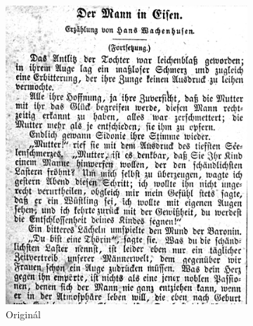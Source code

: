 \documentclass[12pt,a4paper]{article}
\begin{document}
\begin{figure}[h!]
    \centering
    \begin{subfigure}[b]{0.3\textwidth}
        \includegraphics[width=\textwidth]{original2.png}
        \caption{Originál}
    \end{subfigure}
    \hfill
    \begin{subfigure}[b]{0.3\textwidth}

\end{subfigure}
\end{figure}
\end{document}
